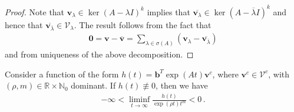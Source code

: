 \begin{proof}
  Note that $\boldsymbol{v}_{\lambda}\in \ker(A-\lambda I)^{k}$
  implies that
  $\overline{\boldsymbol{v}_{\lambda}} \in \ker(A-\overline{\lambda}
  I)^{k}$
  and hence that
  $\overline{ \boldsymbol{v}_{ \overline{\lambda}}} \in
  \mathcal{V}_{\lambda}$.  The result follows from the fact that
\begin{align*}
\boldsymbol{0}=\boldsymbol{v}-\overline{\boldsymbol{v}}=\sum\limits_{\lambda\in \sigma(A)}(\boldsymbol{v}_{\lambda}-\overline{ \boldsymbol{v}_{ \overline{\lambda}}})
\end{align*}
and from uniqueness of the above decomposition.
%
%
\end{proof}

\begin{proposition}\label{liminfprop}
  Consider a function of the form
  $h(t)=\boldsymbol{b}^{T}\exp(At) \boldsymbol{v}^{c}$, where
  $\boldsymbol{v}^{c}\in\mathcal{V}^{c}$, with
  $(\rho,m)\in\mathbb{R}\times \mathbb{N}_{0}$ dominant.
 If $h(t)\not\equiv 0$, then we have
\begin{align*}
-\infty<\liminf\limits_{t\rightarrow\infty} \frac{h(t)}{\exp(\rho
  t)t^{m}}<0 \, .
\end{align*}
\end{proposition}

